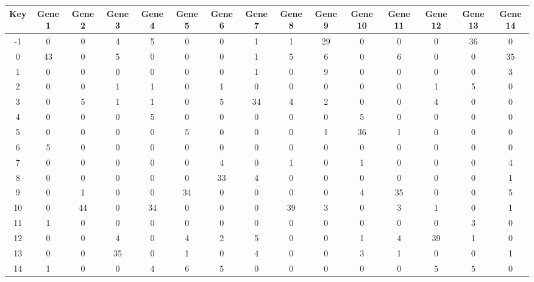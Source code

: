 \begin{tabular}{|c|c|c|c|c|c|c|c|c|c|c|c|c|c|c|}
\hline
Key & Gene 1 & Gene 2 & Gene 3 & Gene 4 & Gene 5 & Gene 6 & Gene 7 & Gene 8 & Gene 9 & Gene 10 & Gene 11 & Gene 12 & Gene 13 & Gene 14 \\
\hline
-1 & 0 & 0 & 4 & 5 & 0 & 0 & 1 & 1 & 29 & 0 & 0 & 0 & 36 & 0 \\
0 & 43 & 0 & 5 & 0 & 0 & 0 & 1 & 5 & 6 & 0 & 6 & 0 & 0 & 35 \\
1 & 0 & 0 & 0 & 0 & 0 & 0 & 1 & 0 & 9 & 0 & 0 & 0 & 0 & 3 \\
2 & 0 & 0 & 1 & 1 & 0 & 1 & 0 & 0 & 0 & 0 & 0 & 1 & 5 & 0 \\
3 & 0 & 5 & 1 & 1 & 0 & 5 & 34 & 4 & 2 & 0 & 0 & 4 & 0 & 0 \\
4 & 0 & 0 & 0 & 5 & 0 & 0 & 0 & 0 & 0 & 5 & 0 & 0 & 0 & 0 \\
5 & 0 & 0 & 0 & 0 & 5 & 0 & 0 & 0 & 1 & 36 & 1 & 0 & 0 & 0 \\
6 & 5 & 0 & 0 & 0 & 0 & 0 & 0 & 0 & 0 & 0 & 0 & 0 & 0 & 0 \\
7 & 0 & 0 & 0 & 0 & 0 & 4 & 0 & 1 & 0 & 1 & 0 & 0 & 0 & 4 \\
8 & 0 & 0 & 0 & 0 & 0 & 33 & 4 & 0 & 0 & 0 & 0 & 0 & 0 & 1 \\
9 & 0 & 1 & 0 & 0 & 34 & 0 & 0 & 0 & 0 & 4 & 35 & 0 & 0 & 5 \\
10 & 0 & 44 & 0 & 34 & 0 & 0 & 0 & 39 & 3 & 0 & 3 & 1 & 0 & 1 \\
11 & 1 & 0 & 0 & 0 & 0 & 0 & 0 & 0 & 0 & 0 & 0 & 0 & 3 & 0 \\
12 & 0 & 0 & 4 & 0 & 4 & 2 & 5 & 0 & 0 & 1 & 4 & 39 & 1 & 0 \\
13 & 0 & 0 & 35 & 0 & 1 & 0 & 4 & 0 & 0 & 3 & 1 & 0 & 0 & 1 \\
14 & 1 & 0 & 0 & 4 & 6 & 5 & 0 & 0 & 0 & 0 & 0 & 5 & 5 & 0 \\
\hline
\end{tabular}